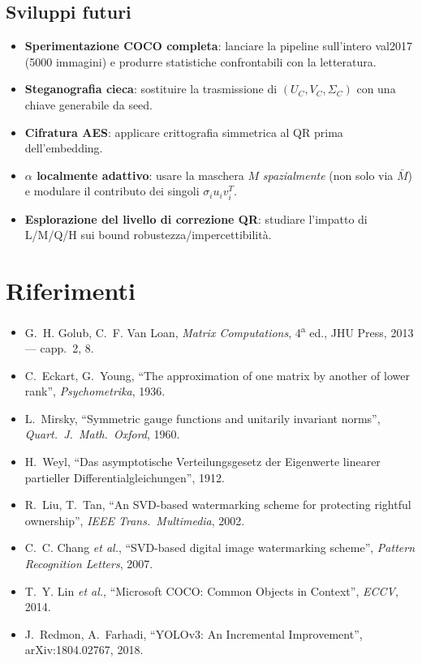 \documentclass[11pt,a4paper]{article}
\theoremstyle{definition}
\theoremstyle{remark}
\begin{document}
\subsection{Sviluppi futuri}
\label{sec:future}

\begin{itemize}[leftmargin=*,itemsep=2pt]
  \item \textbf{Sperimentazione COCO completa}: lanciare la pipeline
        sull'intero val2017 (5000 immagini) e produrre statistiche
        confrontabili con la letteratura.
  \item \textbf{Steganografia cieca}: sostituire la trasmissione di
        $(U_C,V_C,\Sigma_C)$ con una chiave generabile da seed.
  \item \textbf{Cifratura AES}: applicare crittografia simmetrica al
        QR prima dell'embedding.
  \item \textbf{$\alpha$ localmente adattivo}: usare la maschera
        $M$ \emph{spazialmente} (non solo via $\bar M$) e modulare il
        contributo dei singoli $\sigma_i u_i v_i^T$.
  \item \textbf{Esplorazione del livello di correzione QR}: studiare
        l'impatto di L/M/Q/H sui bound robustezza/impercettibilità.
\end{itemize}


\section*{Riferimenti}

\begin{itemize}[leftmargin=*,itemsep=2pt]
  \item G.~H. Golub, C.~F. Van Loan, \emph{Matrix Computations}, 4\textsuperscript{a} ed., JHU Press, 2013 --- capp.\ 2, 8.
  \item C.~Eckart, G.~Young, ``The approximation of one matrix by another of lower rank'', \emph{Psychometrika}, 1936.
  \item L.~Mirsky, ``Symmetric gauge functions and unitarily invariant norms'', \emph{Quart.\ J.\ Math.\ Oxford}, 1960.
  \item H.~Weyl, ``Das asymptotische Verteilungsgesetz der Eigenwerte linearer partieller Differentialgleichungen'', 1912.
  \item R.~Liu, T.~Tan, ``An SVD-based watermarking scheme for protecting rightful ownership'', \emph{IEEE Trans.\ Multimedia}, 2002.
  \item C.~C. Chang \emph{et al.}, ``SVD-based digital image watermarking scheme'', \emph{Pattern Recognition Letters}, 2007.
  \item T.~Y. Lin \emph{et al.}, ``Microsoft COCO: Common Objects in Context'', \emph{ECCV}, 2014.
  \item J.~Redmon, A.~Farhadi, ``YOLOv3: An Incremental Improvement'', arXiv:1804.02767, 2018.
\end{itemize}
\end{document}
